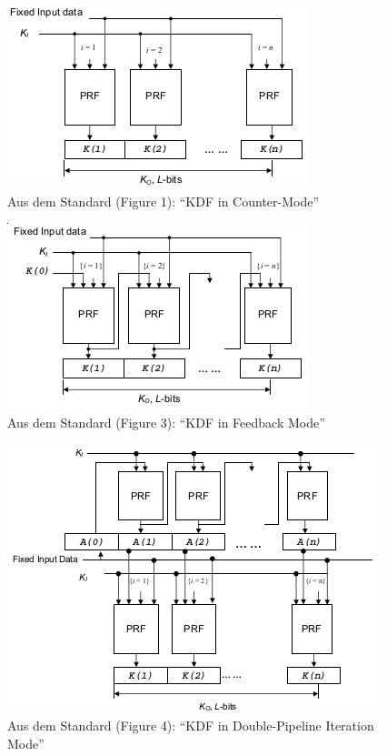 \documentclass[a4paper]{uebungsblatt}
\begin{document}
\begin{aufgabe}[a]
	\begin{figure}[H]
		\centering
		\includegraphics[scale=0.6]{kdf2.png}
		\caption{Aus dem Standard (Figure 1): \enquote{KDF in Counter-Mode}}\label{abb:kdf2}
	\end{figure}
		
	\begin{figure}[H]
		\centering
		\includegraphics[scale=0.6]{kdf3.png}
		\caption{Aus dem Standard (Figure 3): \enquote{KDF in Feedback Mode}}\label{abb:kdf3}
	\end{figure}
	
	\begin{figure}[H]
		\centering
		\includegraphics[scale=0.6]{kdf4.png}
		\caption{Aus dem Standard (Figure 4): \enquote{KDF in Double-Pipeline Iteration Mode}}\label{abb:kdf4}
	\end{figure}


\end{aufgabe}
\end{document}
